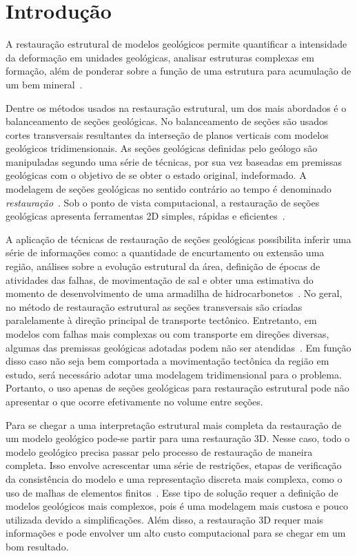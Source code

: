 
\chapter{Introdução}

A restauração estrutural de modelos geológicos permite quantificar a intensidade da deformação em unidades geológicas, analisar estruturas complexas em formação, além de ponderar sobre a função de uma estrutura para acumulação de um bem mineral~\cite{GarciaTese}.

Dentre os métodos usados na restauração estrutural, um dos mais abordados é o balanceamento de seções geológicas. No balanceamento de seções são usados cortes transversais resultantes da interseção de planos verticais com modelos geológicos tridimensionais. As seções geológicas definidas pelo geólogo são manipuladas segundo uma série de técnicas, por sua vez baseadas em premissas geológicas com o objetivo de se obter o estado original, indeformado. A modelagem de seções geológicas no sentido contrário ao tempo é denominado \emph{restauração}~\cite{Fossen}. Sob o ponto de vista computacional, a restauração de seções geológicas apresenta ferramentas 2D simples, rápidas e eficientes~\cite{GarciaTese}.

A aplicação de técnicas de restauração de seções geológicas possibilita inferir uma série de informações como: a quantidade de encurtamento ou extensão uma região, análises sobre a evolução estrutural da área, definição de épocas de atividades das falhas, de movimentação de sal e obter uma estimativa do momento de desenvolvimento de uma armadilha de hidrocarbonetos~\cite{DURANDRIARD-3D, Guedes}. No geral, no método de restauração estrutural as seções transversais são criadas paralelamente à direção principal de transporte tectônico. Entretanto, em modelos com falhas mais complexas ou com transporte em direções diversas, algumas das premissas geológicas adotadas podem não ser atendidas~\cite{GarciaTese}. Em função disso caso não seja bem comportada a movimentação tectônica da região em estudo, será necessário adotar uma modelagem tridimensional para o problema. Portanto, o uso apenas de seções geológicas para restauração estrutural pode não apresentar o que ocorre efetivamente no volume entre seções.

Para se chegar a uma interpretação estrutural mais completa da restauração de um modelo geológico pode-se partir para uma restauração 3D. Nesse caso, todo o modelo geológico precisa passar pelo processo de restauração de maneira completa. Isso envolve acrescentar uma série de restrições, etapas de verificação da consistência do modelo e uma representação discreta mais complexa, como o uso de malhas de elementos finitos~\cite{DURANDRIARD2010441}. Esse tipo de solução requer a definição de modelos geológicos mais complexos, pois é uma modelagem mais custosa e pouco utilizada devido a simplificações. Além disso, a restauração 3D requer mais informações e pode envolver um alto custo computacional para se chegar em um bom resultado.

